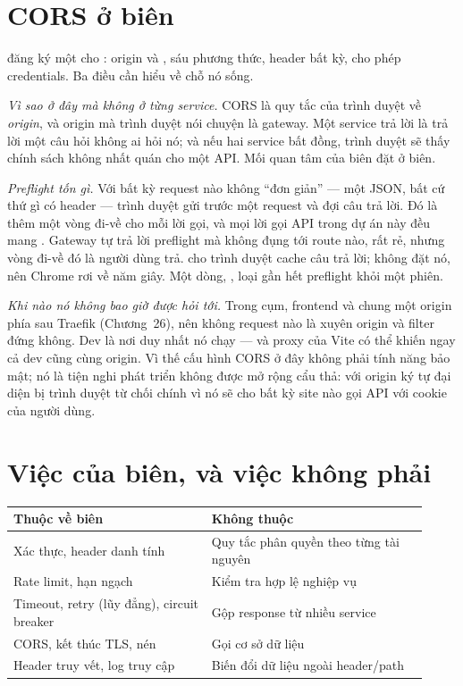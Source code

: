 \section{CORS ở biên}

 đăng ký một  cho \code{/**}:
origin  và , sáu phương thức, header
bất kỳ, cho phép credentials. Ba điều cần hiểu về chỗ nó sống.

\emph{Vì sao ở đây mà không ở từng service.} CORS là quy tắc của trình
duyệt về \emph{origin}, và origin mà trình duyệt nói chuyện là gateway.
Một service trả lời  là trả lời một
câu hỏi không ai hỏi nó; và nếu hai service bất đồng, trình duyệt sẽ
thấy chính sách không nhất quán cho một API. Mối quan tâm của biên đặt
ở biên.

\emph{Preflight tốn gì.} Với bất kỳ request nào không ``đơn giản'' ---
một  JSON, bất cứ thứ gì có header  ---
trình duyệt gửi trước một request  và đợi câu trả lời.
Đó là thêm một vòng đi-về cho mỗi lời gọi, và mọi lời gọi API trong dự
án này đều mang . Gateway tự trả lời preflight mà
không đụng tới route nào, rất rẻ, nhưng vòng đi-về đó là người dùng
trả.  cho trình duyệt cache câu trả lời;
 không đặt nó, nên Chrome rơi về năm giây. Một dòng,
, loại gần hết preflight khỏi một phiên.

\emph{Khi nào nó không bao giờ được hỏi tới.} Trong cụm, frontend và
 chung một origin phía sau Traefik (Chương~26), nên không
request nào là xuyên origin và filter đứng không. Dev là nơi duy nhất
nó chạy --- và proxy của Vite có thể khiến ngay cả dev cũng cùng
origin. Vì thế cấu hình CORS ở đây không phải tính năng bảo mật; nó là
tiện nghi phát triển không được mở rộng cẩu thả:
 với origin ký tự đại diện bị trình duyệt
từ chối chính vì nó sẽ cho bất kỳ site nào gọi API với cookie của
người dùng.

\section{Việc của biên, và việc không phải}

\begin{center}
\small
\begin{tabular}{@{}p{0.44\linewidth}p{0.48\linewidth}@{}}
\toprule
Thuộc về biên & Không thuộc \\
\midrule
Xác thực, header danh tính & Quy tắc phân quyền theo từng tài nguyên \\
Rate limit, hạn ngạch & Kiểm tra hợp lệ nghiệp vụ \\
Timeout, retry (lũy đẳng), circuit breaker & Gộp response từ nhiều service \\
CORS, kết thúc TLS, nén & Gọi cơ sở dữ liệu \\
Header truy vết, log truy cập & Biến đổi dữ liệu ngoài header/path \\
\bottomrule
\end{tabular}
\end{center}

